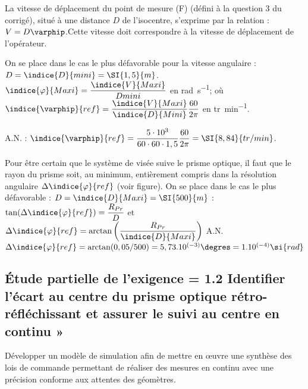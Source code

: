 \ifprof
\begin{corrige}
La vitesse de déplacement du point de mesure (F) (défini à la question 3 du corrigé), situé à une distance $D$ de l’isocentre, s’exprime par la relation : $V=D\varphip$.Cette vitesse doit correspondre à la vitesse de déplacement de l’opérateur. 

On se place dans le cas le plus défavorable pour la vitesse angulaire : $D=\indice{D}{mini} = \SI{1,5}{m}$. 
$\indice{\varphi}{Maxi} = \dfrac{\indice{V}{Maxi}}{{D}{mini}}$ en \si{rad.s^{-1}};  où 
$\indice{\varphip}{ref} = \dfrac{\indice{V}{Maxi}}{\indice{D}{Mini}} \dfrac{60}{2\pi}$ en \si{tr.min^{-1}}.

A.N. : $\indice{\varphip}{ref} = \dfrac{5\cdot 10^3 }{60\cdot 60\cdot 1,5} \dfrac{60}{2\pi} =\SI{8,84}{tr/min}$.

Pour être certain que le système de visée suive le prisme optique, il faut que le rayon du prisme soit, au minimum, entièrement compris dans la résolution angulaire $\Delta \indice{\varphi}{ref}$ (voir figure).
On se place dans le cas le plus défavorable : $D=\indice{D}{Maxi} =\SI{500}{m}$ :  
$\tan(\Delta \indice{\varphi}{ref})=\dfrac{R_{Pr}}{D}$ et $\Delta \indice{\varphi}{ref}=\arctan\left(\dfrac{R_{Pr}}{\indice{D}{Maxi}}\right)$
A.N.  $\Delta \indice{\varphi}{ref}=\arctan(0,05/500)=5,73.10^{(-3)}\degres =1.10^{(-4)} \si{rad}$

\end{corrige}
\else
\fi


\subsection{Étude partielle de l'exigence =  1.2   Identifier l'écart au centre du prisme optique rétro-réfléchissant et assurer le suivi au centre en continu »}
\begin{obj}
Développer un modèle de simulation afin de mettre en œuvre une synthèse des lois de commande permettant de réaliser des mesures en continu avec une précision conforme aux attentes des géomètres.
\end{obj}


